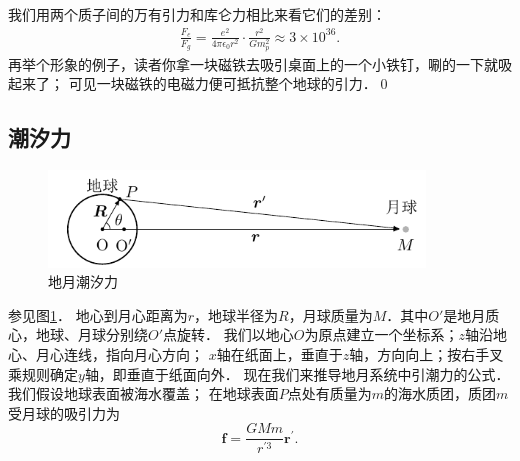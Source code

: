 我们用两个质子间的万有引力和库仑力相比来看它们的差别：
\begin{align}
    \frac{F_e}{F_g}=\frac{e^2}{4\pi \epsilon_0 r^2}\cdot \frac{r^2}{Gm^2_p} 
    \approx 3\times 10^{36} .
\end{align}
再举个形象的例子，读者你拿一块磁铁去吸引桌面上的一个小铁钉，唰的一下就吸起来了；
可见一块磁铁的电磁力便可抵抗整个地球的引力．\qed


\subsection{潮汐力}


\begin{figure}[htb]
    \centering
    \includegraphics[width=10cm]{fig/II1-Earth.pdf}
    \caption{地月潮汐力} \label{chsr:fig_tidal-force}
\end{figure}



参见图\ref{chsr:fig_tidal-force}．
地心到月心距离为$r$，地球半径为$R$，月球质量为$M$．其中$O'$是地月质心，地球、月球分别绕$O'$点旋转．
我们以地心$O$为原点建立一个坐标系；$z$轴沿地心、月心连线，指向月心方向；
$x$轴在纸面上，垂直于$z$轴，方向向上；按右手叉乘规则确定$y$轴，即垂直于纸面向外．
现在我们来推导地月系统中引潮力的公式．
我们假设地球表面被海水覆盖；
在地球表面$P$点处有质量为$m$的海水质团，质团$m$受月球的吸引力为
\begin{equation}
    \boldsymbol{f} =\frac{GMm}{r^{\prime 3}} \boldsymbol{r}^{\prime} .
\end{equation}

